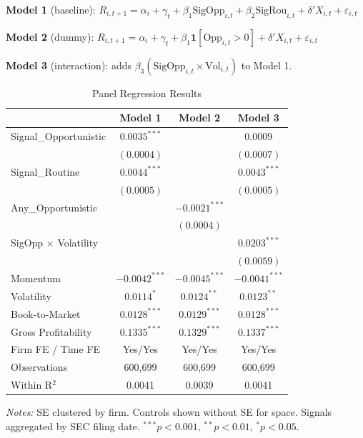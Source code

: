 \documentclass{article}
\begin{document}
\vspace{4pt}
\noindent\textbf{Model 1} (baseline): $R_{i,t+1} = \alpha_i + \gamma_t + \beta_1 \text{SigOpp}_{i,t} + \beta_2 \text{SigRou}_{i,t} + \delta' X_{i,t} + \varepsilon_{i,t}$

\noindent\textbf{Model 2} (dummy): $R_{i,t+1} = \alpha_i + \gamma_t + \beta_1 \mathbf{1}[\text{Opp}_{i,t}>0] + \delta' X_{i,t} + \varepsilon_{i,t}$

\noindent\textbf{Model 3} (interaction): adds $\beta_3(\text{SigOpp}_{i,t} \times \text{Vol}_{i,t})$ to Model 1.


\begin{table}[h!]
\centering
\caption{Panel Regression Results}
\label{tab:regressions}
\small
\begin{tabular}{lccc}
\toprule
 & Model 1 & Model 2 & Model 3 \\
\midrule
Signal\_Opportunistic           & $0.0035^{***}$ &                 & $0.0009$       \\
                                & $(0.0004)$     &                 & $(0.0007)$     \\
Signal\_Routine                 & $0.0044^{***}$ &                 & $0.0043^{***}$ \\
                                & $(0.0005)$     &                 & $(0.0005)$     \\
Any\_Opportunistic              &                & $-0.0021^{***}$ &                \\
                                &                & $(0.0004)$      &                \\
SigOpp $\times$ Volatility      &                &                 & $0.0203^{***}$ \\
                                &                &                 & $(0.0059)$     \\
Momentum                        & $-0.0042^{***}$ & $-0.0045^{***}$ & $-0.0041^{***}$ \\
Volatility                      & $0.0114^{*}$   & $0.0124^{**}$  & $0.0123^{**}$  \\
Book-to-Market                  & $0.0128^{***}$ & $0.0129^{***}$ & $0.0128^{***}$ \\
Gross Profitability             & $0.1335^{***}$ & $0.1329^{***}$ & $0.1337^{***}$ \\
\midrule
Firm FE / Time FE  & Yes/Yes   & Yes/Yes   & Yes/Yes   \\
Observations       & 600,699   & 600,699   & 600,699   \\
Within R$^2$       & 0.0041    & 0.0039    & 0.0041    \\
\bottomrule
\end{tabular}
\begin{minipage}{\linewidth}
\vspace{2pt}
\small\textit{Notes:} SE clustered by firm. Controls shown without SE for space. Signals aggregated by SEC filing date. $^{***}p<0.001$, $^{**}p<0.01$, $^{*}p<0.05$.
\end{minipage}
\end{table}
\end{document}
